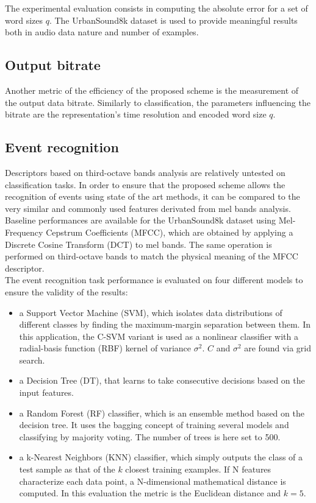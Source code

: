 \documentclass[12pt,times,onecolumn]{article}
\begin{document}
The experimental evaluation consists in computing the absolute error for a set of word sizes $q$. The UrbanSound8k dataset is used to provide meaningful results both in audio data nature and number of examples.

\subsection{Output bitrate}

Another metric of the efficiency of the proposed scheme is the measurement of the output data bitrate. Similarly to classification, the parameters influencing the bitrate are the representation's time resolution and encoded word size $q$.

\subsection{Event recognition}

Descriptors based on third-octave bands analysis are relatively untested on classification tasks. In order to ensure that the proposed scheme allows the recognition of events using state of the art methods, it can be compared to the very similar and commonly used features derivated from mel bands analysis. Baseline performances \cite{salamon2014} are available for the UrbanSound8k dataset using Mel-Frequency Cepstrum Coefficients (MFCC), which are obtained by applying a Discrete Cosine Transform (DCT) to mel bands. The same operation is performed on third-octave bands to match the physical meaning of the MFCC descriptor.\\

The event recognition task performance is evaluated on four different models to ensure the validity of the results:
\begin{itemize}
\item a Support Vector Machine (SVM), which isolates data distributions of different classes by finding the maximum-margin separation between them. In this application, the C-SVM variant is used as a nonlinear classifier with a radial-basis function (RBF) kernel of variance $\sigma^2$. $C$ and $\sigma^2$ are found via grid search.
\item a Decision Tree (DT), that learns to take consecutive decisions based on the input features.
\item a Random Forest (RF) classifier, which is an ensemble method based on the decision tree. It uses the bagging concept of training several models and classifying by majority voting. The number of trees is here set to 500.
\item a k-Nearest Neighbors (KNN) classifier, which simply outputs the class of a test sample as that of the $k$ closest training examples. If N features characterize each data point, a N-dimensional mathematical distance is computed. In this evaluation the metric is the Euclidean distance and $k = 5$.
\end{itemize}
\end{document}
